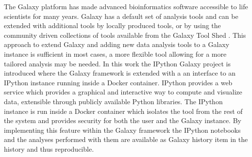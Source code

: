 \documentclass{bioinfo}
\begin{document}
The Galaxy platform \citep{Blank2010,Giardine2005,Goecks2010} has made advanced bioinformatics software accessible to life scientists for many years. Galaxy has a default set of analysis tools and can be extended with additional tools by locally produced tools, or by using the community driven collections of tools available from the Galaxy Tool Shed \citep{Blankenber2014}. This approach to extend Galaxy and adding new data analysis tools to a Galaxy instance is sufficient in most cases, a more flexible tool allowing for a more tailored analysis may be needed. In this work the IPython Galaxy project is introduced where the Galaxy framework is extended with a an interface to an IPython \citep{Perez2007} instance running inside a Docker container. IPython provides a web service which provides a graphical and interactive way to compute and visualize data, extensible through publicly available Python libraries. The IPython instance is run inside a Docker container which isolates the tool from the rest of the system and provides security for both the user and the Galaxy instance. By implementing this feature within the Galaxy framework the IPython notebooks and the analyses performed with them are available as Galaxy history item in the history and thus reproducible. 
\end{document}
